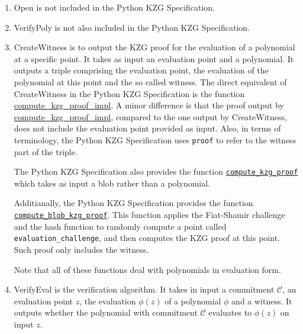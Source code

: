 \documentclass[12pt]{galois-whitepaper}
\begin{document}
\begin{enumerate}
\begin{enumerate}
    \item \textsf{Open} is not included in the Python KZG Specification.
    
    \item \textsf{VerifyPoly} is not also included in the Python KZG Specification.
    
    \item \textsf{CreateWitness} is to output the KZG proof for the evaluation of a polynomial at a specific point.
    It takes as input an evaluation point and a polynomial.
    It outputs a triple comprising the evaluation point, the evaluation of the polynomial at this point and the so called witness. 
    The direct equivalent of  \textsf{CreateWitness} in the Python KZG Specification is the function  \href{https://github.com/ethereum/consensus-specs/blob/dev/specs/deneb/polynomial-commitments.md\#compute_kzg_proof_impl}{compute\_kzg\_proof\_impl}.
    A minor difference is that the proof output by \href{https://github.com/ethereum/consensus-specs/blob/dev/specs/deneb/polynomial-commitments.md\#compute_kzg_proof_impl}{compute\_kzg\_proof\_impl}, compared to the one output by \textsf{CreateWitness}, does not include the evaluation point provided as input.
    Also, in terms of terminology, the Python KZG Specification uses \texttt{proof} to refer to the witness part of the triple.

    The Python KZG Specification also provides the function \href{https://github.com/ethereum/consensus-specs/blob/dev/specs/deneb/polynomial-commitments.md\#compute_kzg_proof}{\texttt{compute\_kzg\_proof}} which takes as input a blob rather than a polynomial.
    
    Additianally, the Python KZG Specification provides the function
    \href{https://github.com/ethereum/consensus-specs/blob/dev/specs/deneb/polynomial-commitments.md\#compute_blob_kzg_proof}{\texttt{compute\_blob\_kzg\_proof}}.
    This function applies the Fiat-Shamir challenge and the hash function to randomly compute a point called \texttt{evaluation\_challenge}, and then computes the KZG proof at this point.
    Such proof only includes the witness.

    Note that all of these functions deal with polynomials in evaluation form.
    
    \item \textsf{VerifyEval} is the verification algorithm.
    It takes in input a commitment $\mathcal{C}$, an evaluation point $z$, the evaluation $\phi(z)$ of a polynomial $\phi$ and a witness.
    It outputs whether the polynomial with commitment $\mathcal{C}$ evaluates to $\phi(z)$ on input $z$.


\end{enumerate}
\end{enumerate}
\end{document}
